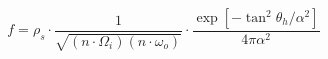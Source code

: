 \begin{equation}
     f =\rho_s\cdot
        \frac{1}{\sqrt{({n}\cdot\Omega_{i})
                       ({n}\cdot\omega_{o})}}\cdot
        \frac{\exp[-\tan^2\theta_{h}/\alpha^2]}
            {4\pi\alpha^2}
\end{equation}